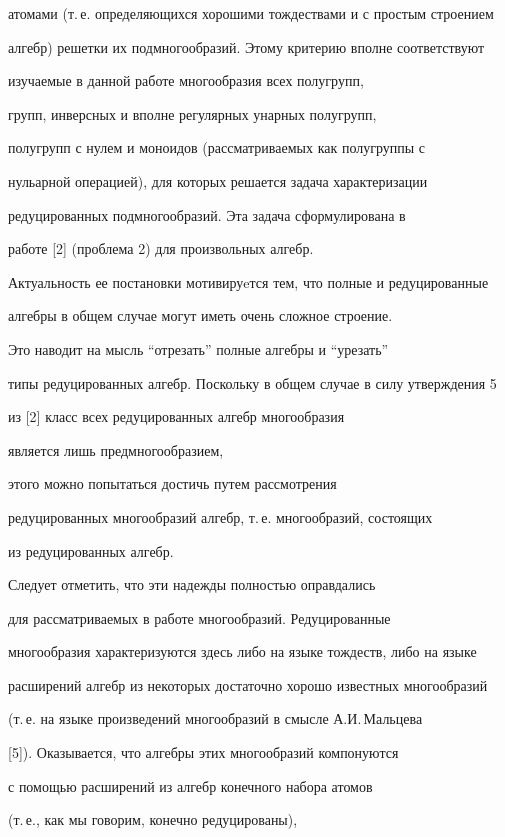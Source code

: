 атомами (т.\,е. определяющихся хорошими тождествами и с простым строением


алгебр) решетки их подмногообразий. Этому критерию вполне соответствуют


изучаемые в данной работе многообразия всех полугрупп,


групп, инверсных и вполне регулярных унарных полугрупп,


полугрупп с нулем и моноидов (рассматриваемых как полугруппы с


нульарной операцией), для которых решается задача характеризации


редуцированных подмногообразий. Эта задача сформулирована в


работе [2] (проблема 2) для произвольных алгебр.


Актуальность ее постановки мотивируeтся тем, что полные и редуцированные


алгебры в общем случае могут иметь очень сложное строение.


Это наводит на мысль ``отрезать'' полные алгебры и ``урезать''


типы редуцированных алгебр. Поскольку в общем случае в силу утверждения 5


из [2] класс всех редуцированных алгебр многообразия


является лишь предмногообразием,


этого можно попытаться достичь путем рассмотрения


редуцированных многообразий алгебр, т.\,е. многообразий, состоящих


из редуцированных алгебр.





Следует отметить, что эти надежды полностью оправдались


для рассматриваемых в работе многообразий. Редуцированные


многообразия характеризуются здесь либо на языке тождеств, либо на языке


расширений алгебр из некоторых достаточно хорошо известных многообразий


(т.\,е. на языке произведений многообразий в смысле А.И.\,Мальцева


[5]). Оказывается, что алгебры этих многообразий компонуются


с помощью расширений из алгебр конечного набора атомов


(т.\,е., как мы говорим, конечно редуцированы),


